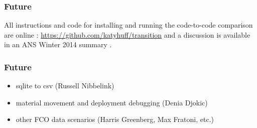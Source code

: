 
\begin{frame}[fragile]
\frametitle{Future}
All instructions and code for installing and running the code-to-code 
comparison are online : \url{https://github.com/katyhuff/transition} and a discussion is 
available in an ANS Winter 2014 summary \cite{huff_extensions_2014}.
\end{frame}


\begin{frame}[fragile]
\frametitle{Future}
\begin{itemize}
\item sqlite to csv (Russell Nibbelink) 
\item material movement and deployment debugging (Denia Djokic)
\item other FCO data scenarios (Harris Greenberg, Max Fratoni, etc.)
\end{itemize}
\end{frame}
